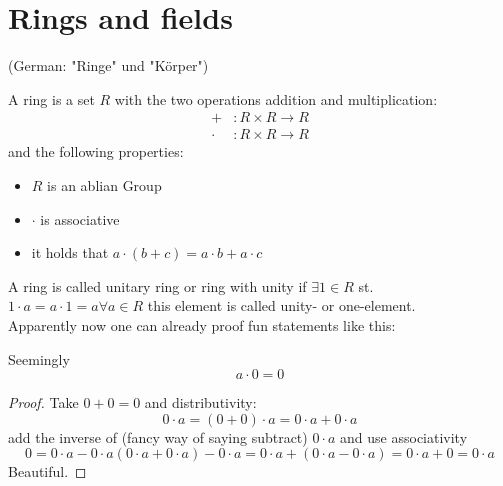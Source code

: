 \section{Rings and fields}
(German: "Ringe" und "Körper")

\begin{framed}
\begin{definition}[Ring] A ring is a set $R$ with the two operations addition and multiplication:
    \begin{align}
        +     &: R\times R \rightarrow R \\
        \cdot &: R\times R \rightarrow R
    \end{align}
    and the following properties:
    \begin{itemize}[itemsep=3pt, topsep=3pt]
        \item $R$ is an ablian Group
        \item $\cdot$ is associative
        \item it holds that $a\cdot(b+c) = a\cdot b + a\cdot c$
    \end{itemize}
\end{definition}
\end{framed}

A ring is called unitary ring or ring with unity if $\exists 1 \in R$ st. $1\cdot a = a\cdot 1 = a \forall a\in R$ this element is called unity- or one-element.\\

Apparently now one can already proof fun statements like this:
\begin{framed}
\begin{lemma}
    Seemingly
    $$a \cdot 0 = 0$$
\end{lemma}
\end{framed}
\begin{proof}
    Take $0+ 0 = 0$  and distributivity:
    $$0\cdot a = (0+0)\cdot a = 0\cdot a+ 0\cdot a$$
    add the inverse of (fancy way of saying subtract) $0\cdot a$ and use associativity
    $$0 = 0\cdot a - 0\cdot a (0\cdot a + 0\cdot a) - 0\cdot a = 0\cdot a + (0\cdot a -0\cdot a)= 0\cdot a + 0 = 0\cdot a$$
    Beautiful.
\end{proof}

